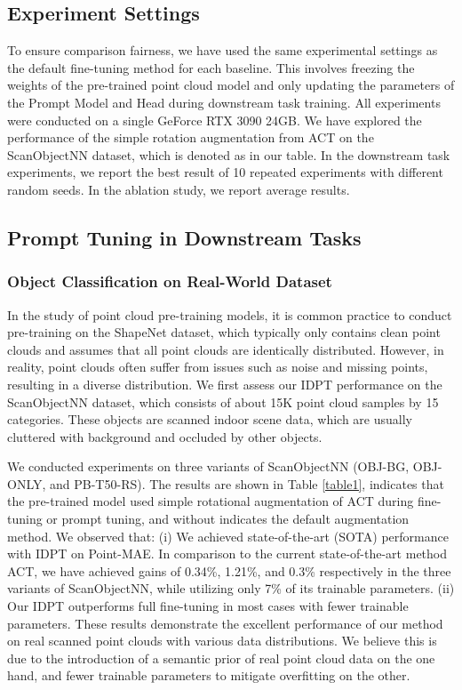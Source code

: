 \documentclass[10pt,twocolumn,letterpaper]{article}
\begin{document}
\subsection{Experiment Settings}

To ensure comparison fairness, we have used the same experimental settings as the default fine-tuning method for each baseline. This involves freezing the weights of the pre-trained point cloud model and only updating the parameters of the Prompt Model and Head during downstream task training. All experiments were conducted on a single GeForce RTX 3090 24GB. We have explored the performance of the simple rotation augmentation from ACT \cite{dong2022autoencoders} on the ScanObjectNN \cite{uy2019revisiting} dataset, which is denoted as \textcolor{red}{} in our table. 
In the downstream task experiments, we report the best result of 10 repeated experiments with different random seeds. In the ablation study, we report average results.


\subsection{Prompt Tuning in Downstream Tasks}
\subsubsection{Object Classification on Real-World Dataset} 
In the study of point cloud pre-training models, it is common practice to conduct pre-training on the ShapeNet \cite{chang2015shapenet} dataset, which typically only contains clean point clouds and assumes that all point clouds are identically distributed. However, in reality, point clouds often suffer from issues such as noise and missing points, resulting in a diverse distribution. We first assess our IDPT performance on the ScanObjectNN \cite{uy2019revisiting} dataset, which consists of about 15K point cloud samples by 15 categories. These objects are scanned indoor scene data, which are usually cluttered with background and occluded by other objects.

We conducted experiments on three variants of ScanObjectNN \cite{uy2019revisiting} (OBJ-BG, OBJ-ONLY, and PB-T50-RS). The results are shown in Table \ref{table1}, \textcolor{red}{} indicates that the pre-trained model used simple rotational augmentation of ACT during fine-tuning or prompt tuning, and without \textcolor{red}{} indicates the default augmentation method. We observed that: (i) We achieved state-of-the-art (SOTA) performance with IDPT on Point-MAE\textcolor{red}{}. 
In comparison to the current state-of-the-art method ACT, we have achieved gains of 0.34\%, 1.21\%, and 0.3\% respectively in the three variants of ScanObjectNN, while utilizing only 7\% of its trainable parameters. 
(ii) Our IDPT outperforms full fine-tuning in most cases with fewer trainable parameters. These results demonstrate the excellent performance of our method on real scanned point clouds with various data distributions. We believe this is due to the introduction of a semantic prior of real point cloud data on the one hand, and fewer trainable parameters to mitigate overfitting on the other.
\end{document}
